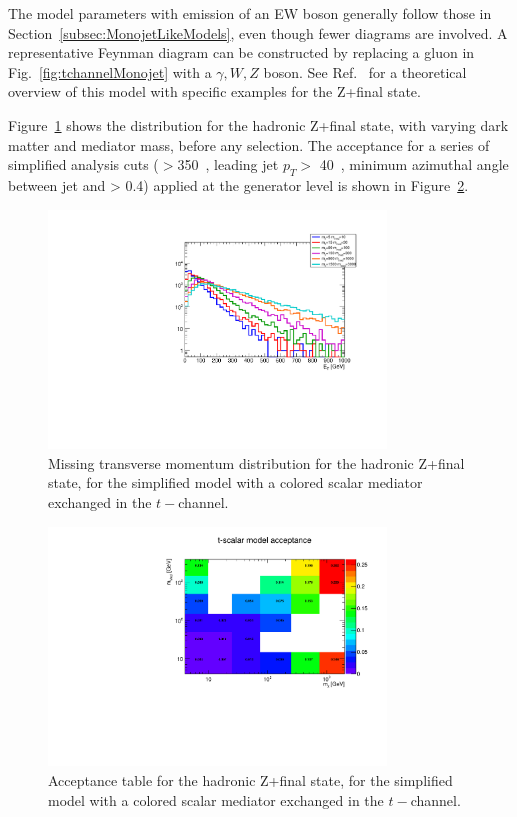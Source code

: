 The model parameters with emission of an EW boson 
generally follow those in Section~\ref{subsec:MonojetLikeModels},
even though fewer diagrams are involved.   
A representative Feynman diagram can be
constructed by replacing a gluon in Fig.~\ref{fig:tchannelMonojet}
with a $\gamma,W,Z$ boson. See Ref.~\cite{Bell:2012rg} for a theoretical overview
of this model with specific examples for the Z+\MET final state. 

Figure~\ref{fig:TChan_EW_Zhad_MET} shows the \MET distribution for the hadronic Z+\MET final state, 
with varying dark matter and mediator mass, before any selection. 
The acceptance for a series of simplified analysis cuts 
(\MET$>$350~\gev, leading jet $p_T >$ 40~\gev, minimum azimuthal angle between jet and \MET > 0.4) 
applied at the generator level is shown in Figure~\ref{fig:TChan_EW_Zhad_acc}. 

\begin{figure}[h!]
\centering  
\includegraphics[width=0.8\textwidth]{figures/EW/monoZhad_TChannel/metPt}
\caption{Missing transverse momentum distribution for the hadronic Z+\MET final state,
for the simplified model with a colored scalar mediator exchanged in the $t-$channel.}
\label{fig:TChan_EW_Zhad_MET}
\end{figure}

\begin{figure}[h!]
\centering  
\includegraphics[width=0.8\textwidth]{figures/EW/monoZhad_TChannel/acc}
\caption{Acceptance table for the hadronic Z+\MET final state,
for the simplified model with a colored scalar mediator exchanged in the $t-$channel.}
\label{fig:TChan_EW_Zhad_acc}
\end{figure}

